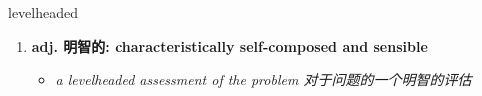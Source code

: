 
\begin{frame}
{\huge levelheaded}
\begin{center}
\begin{enumerate}\Large
  \item \textbf{adj. 明智的: characteristically self-composed and sensible}
  \begin{itemize}
    \item \em{\Large{a levelheaded assessment of the problem 对于问题的一个明智的评估}}
  \end{itemize}
\end{enumerate}
\end{center}
\end{frame}
